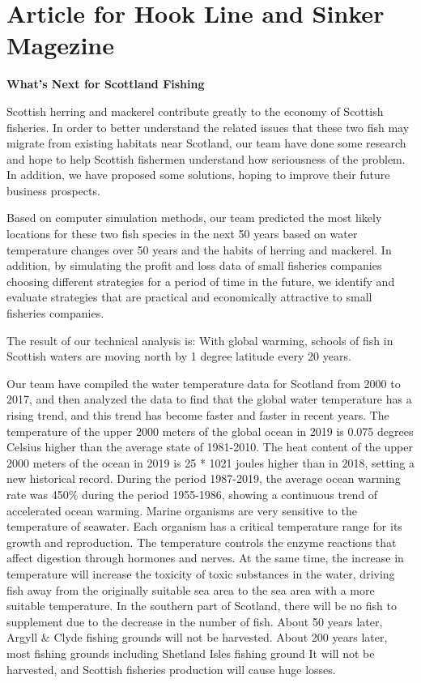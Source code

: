 \documentclass{mcmthesis}
\numberwithin{figure}{section}
\numberwithin{table}{section}
\begin{document}
\section{Article for Hook Line and Sinker Magezine}
\begin{center}
\textbf{What's Next for Scottland Fishing}
\end{center}

Scottish herring and mackerel contribute greatly to the economy of Scottish fisheries. In order to better understand the related issues that these two fish may migrate from existing habitats near Scotland, our team have done some research and hope to help Scottish fishermen understand how seriousness of  the problem. In addition, we have proposed some solutions, hoping to improve their future business prospects.

Based on computer simulation methods, our team predicted the most likely locations for these two fish species in the next 50 years based on water temperature changes over 50 years and the habits of herring and mackerel. In addition, by simulating the profit and loss data of small fisheries companies choosing different strategies for a period of time in the future, we identify and evaluate strategies that are practical and economically attractive to small fisheries companies.

The result of our technical analysis is: With global warming, schools of fish in Scottish waters are moving north by 1 degree latitude every 20 years.

Our team have compiled the water temperature data for Scotland from 2000 to 2017, and then analyzed the data to find that the global water temperature has a rising trend, and this trend has become faster and faster in recent years. The temperature of the upper 2000 meters of the global ocean in 2019 is 0.075 degrees Celsius higher than the average state of 1981-2010. The heat content of the upper 2000 meters of the ocean in 2019 is 25 * 1021 joules higher than in 2018, setting a new historical record. During the period 1987-2019, the average ocean warming rate was 450\% during the period 1955-1986, showing a continuous trend of accelerated ocean warming. Marine organisms are very sensitive to the temperature of seawater. Each organism has a critical temperature range for its growth and reproduction. The temperature controls the enzyme reactions that affect digestion through hormones and nerves. At the same time, the increase in temperature will increase the toxicity of toxic substances in the water, driving fish away from the originally suitable sea area to the sea area with a more suitable temperature. In the southern part of Scotland, there will be no fish to supplement due to the decrease in the number of fish. About 50 years later, Argyll \& Clyde fishing grounds will not be harvested. About 200 years later, most fishing grounds including Shetland Isles fishing ground It will not be harvested, and Scottish fisheries production will cause huge losses.
\end{document}
